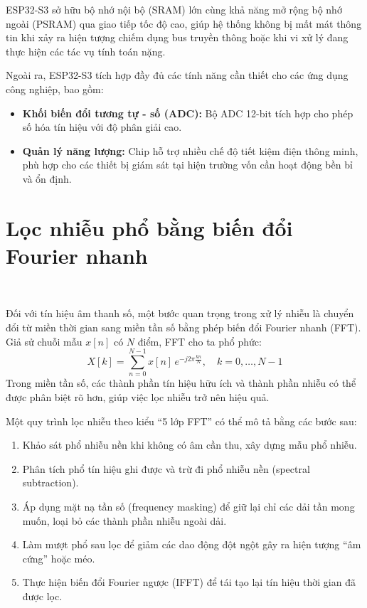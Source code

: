 \documentclass[a4paper]{report}
\begin{document}
ESP32-S3 sở hữu bộ nhớ nội bộ (SRAM) lớn cùng khả năng mở rộng bộ nhớ ngoài (PSRAM) qua giao tiếp tốc độ cao, giúp hệ thống không bị mất mát thông tin khi xảy ra hiện tượng chiếm dụng bus truyền thông hoặc khi vi xử lý đang thực hiện các tác vụ tính toán nặng.

Ngoài ra, ESP32-S3 tích hợp đầy đủ các tính năng cần thiết cho các ứng dụng công nghiệp, bao gồm:
\begin{itemize}
    \item \textbf{Khối biến đổi tương tự - số (ADC):} Bộ ADC 12-bit tích hợp cho phép số hóa tín hiệu với độ phân giải cao.
    \item \textbf{Quản lý năng lượng:} Chip hỗ trợ nhiều chế độ tiết kiệm điện thông minh, phù hợp cho các thiết bị giám sát tại hiện trường vốn cần hoạt động bền bỉ và ổn định.
\end{itemize}

\section{Lọc nhiễu phổ bằng biến đổi Fourier nhanh}

\ 

Đối với tín hiệu âm thanh số, một bước quan trọng trong xử lý nhiễu là chuyển đổi từ miền thời gian sang miền tần số bằng phép biến đổi Fourier nhanh (FFT). Giả sử chuỗi mẫu $x[n]$ có $N$ điểm, FFT cho ta phổ phức:
\begin{equation}
X[k] = \sum_{n=0}^{N-1} x[n] \, e^{-j 2\pi \frac{kn}{N}}, \quad k=0,\ldots,N-1
\end{equation}
Trong miền tần số, các thành phần tín hiệu hữu ích và thành phần nhiễu có thể được phân biệt rõ hơn, giúp việc lọc nhiễu trở nên hiệu quả.

Một quy trình lọc nhiễu theo kiểu ``5 lớp FFT'' có thể mô tả bằng các bước sau:
\begin{enumerate}
  \item Khảo sát phổ nhiễu nền khi không có âm cần thu, xây dựng mẫu phổ nhiễu.
  \item Phân tích phổ tín hiệu ghi được và trừ đi phổ nhiễu nền (spectral subtraction).
  \item Áp dụng mặt nạ tần số (frequency masking) để giữ lại chỉ các dải tần mong muốn, loại bỏ các thành phần nhiễu ngoài dải.
  \item Làm mượt phổ sau lọc để giảm các dao động đột ngột gây ra hiện tượng ``âm cứng'' hoặc méo.
  \item Thực hiện biến đổi Fourier ngược (IFFT) để tái tạo lại tín hiệu thời gian đã được lọc.
\end{enumerate}
\end{document}
